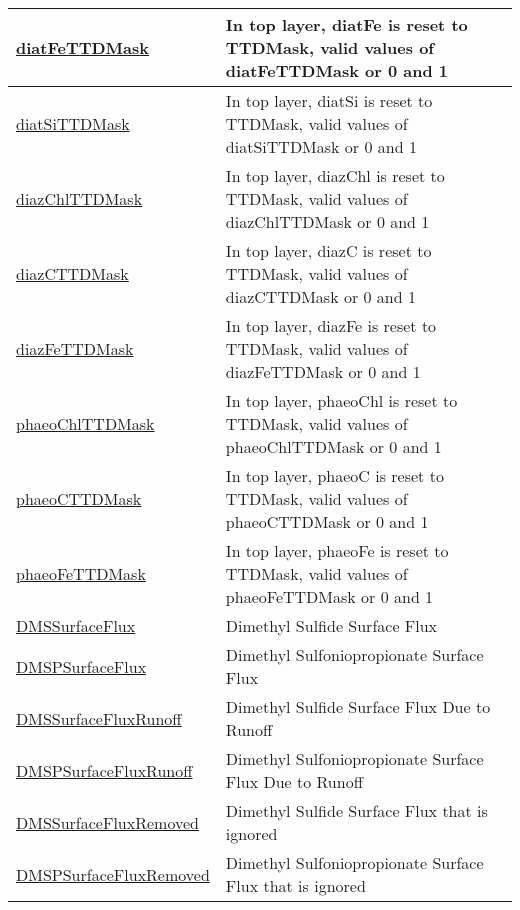 {\begin{center}
\begin{longtable}{| p{2.0in} | p{4.0in} |}
    \hline
    \hyperref[subsec:var_sec_forcing_diatFeTTDMask]{diatFeTTDMask} & In top layer, diatFe is reset to TTDMask, valid values of diatFeTTDMask or 0 and 1 \\
    \hline
    \hyperref[subsec:var_sec_forcing_diatSiTTDMask]{diatSiTTDMask} & In top layer, diatSi is reset to TTDMask, valid values of diatSiTTDMask or 0 and 1 \\
    \hline
    \hyperref[subsec:var_sec_forcing_diazChlTTDMask]{diazChlTTDMask} & In top layer, diazChl is reset to TTDMask, valid values of diazChlTTDMask or 0 and 1 \\
    \hline
    \hyperref[subsec:var_sec_forcing_diazCTTDMask]{diazCTTDMask} & In top layer, diazC is reset to TTDMask, valid values of diazCTTDMask or 0 and 1 \\
    \hline
    \hyperref[subsec:var_sec_forcing_diazFeTTDMask]{diazFeTTDMask} & In top layer, diazFe is reset to TTDMask, valid values of diazFeTTDMask or 0 and 1 \\
    \hline
    \hyperref[subsec:var_sec_forcing_phaeoChlTTDMask]{phaeoChlTTDMask} & In top layer, phaeoChl is reset to TTDMask, valid values of phaeoChlTTDMask or 0 and 1 \\
    \hline
    \hyperref[subsec:var_sec_forcing_phaeoCTTDMask]{phaeoCTTDMask} & In top layer, phaeoC is reset to TTDMask, valid values of phaeoCTTDMask or 0 and 1 \\
    \hline
    \hyperref[subsec:var_sec_forcing_phaeoFeTTDMask]{phaeoFeTTDMask} & In top layer, phaeoFe is reset to TTDMask, valid values of phaeoFeTTDMask or 0 and 1 \\
    \hline
    \hyperref[subsec:var_sec_forcing_DMSSurfaceFlux]{DMSSurfaceFlux} & Dimethyl Sulfide Surface Flux \\
    \hline
    \hyperref[subsec:var_sec_forcing_DMSPSurfaceFlux]{DMSPSurfaceFlux} & Dimethyl Sulfoniopropionate Surface Flux \\
    \hline
    \hyperref[subsec:var_sec_forcing_DMSSurfaceFluxRunoff]{DMSSurfaceFluxRunoff} & Dimethyl Sulfide Surface Flux Due to Runoff \\
    \hline
    \hyperref[subsec:var_sec_forcing_DMSPSurfaceFluxRunoff]{DMSPSurfaceFluxRunoff} & Dimethyl Sulfoniopropionate Surface Flux Due to Runoff \\
    \hline
    \hyperref[subsec:var_sec_forcing_DMSSurfaceFluxRemoved]{DMSSurfaceFluxRemoved} & Dimethyl Sulfide Surface Flux that is ignored \\
    \hline
    \hyperref[subsec:var_sec_forcing_DMSPSurfaceFluxRemoved]{DMSPSurfaceFluxRemoved} & Dimethyl Sulfoniopropionate Surface Flux that is ignored \\

\end{longtable}
\end{center}}
